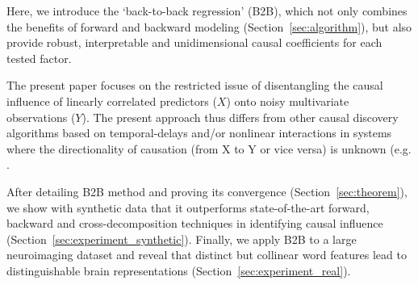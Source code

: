 Here, we introduce the `back-to-back regression' (B2B), which not only combines the benefits of forward and backward modeling (Section~\ref{sec:algorithm}), but also provide robust, interpretable and unidimensional causal coefficients for each tested factor.

The present paper focuses on the restricted issue of disentangling the causal influence of linearly correlated predictors ($X$) onto noisy multivariate observations ($Y$). The present approach thus differs from other causal discovery algorithms based on temporal-delays and/or nonlinear interactions in systems where the directionality of causation (from X to Y or vice versa) is unknown (e.g. \citep{peters2017elements, granger1969investigating, janzing2013quantifying, scholkopf2016modeling}.

After detailing B2B method and proving its convergence (Section~\ref{sec:theorem}), we show with synthetic data that it outperforms state-of-the-art forward, backward and cross-decomposition techniques in identifying causal influence (Section~\ref{sec:experiment_synthetic}). Finally, we apply B2B to a large neuroimaging dataset and reveal that distinct but collinear word features lead to distinguishable brain representations (Section~\ref{sec:experiment_real}).
